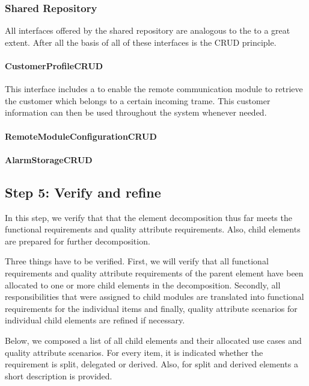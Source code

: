 \subsubsection{Shared Repository} 

\npar All interfaces offered by the shared repository are analogous to the
 to a great extent. After all the basis of all of these
interfaces is the CRUD principle.

\paragraph{CustomerProfileCRUD}
\npar This interface includes a  to
enable the remote communication module to retrieve the customer which belongs to
a certain incoming trame. This customer information can then be used throughout
the system whenever needed.

\paragraph{RemoteModuleConfigurationCRUD}

\npar 

\paragraph{AlarmStorageCRUD}

\npar 

\subsection{Step 5: Verify and refine}
\label{add:it1/verification}

\npar In this step, we verify that that the element decomposition thus far meets
the functional requirements and quality attribute requirements. Also, child
elements are prepared for further decomposition.

\npar Three things have to be verified. First, we will verify that all
functional requirements and quality attribute requirements of the parent element
have been allocated to one or more child elements in the decomposition.
Secondly, all responsibilities that were assigned to child modules are
translated into functional requirements for the individual items and finally,
quality attribute scenarios for individual child elements are refined if
necessary.

\npar Below, we composed a list of all child elements and their allocated use
cases and quality attribute scenarios. For every item, it is indicated whether
the requirement is split, delegated or derived. Also, for split and derived
elements a short description is provided.

